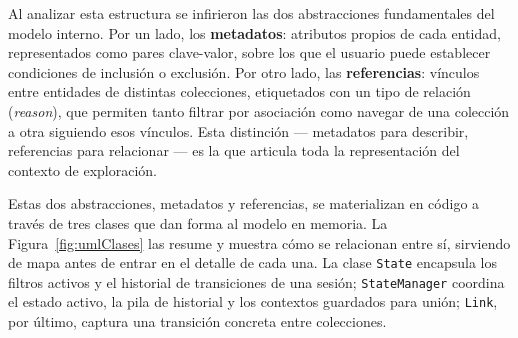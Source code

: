 Al analizar esta estructura se infirieron las dos abstracciones fundamentales del modelo
interno. Por un lado, los \textbf{metadatos}: atributos propios de cada entidad, representados
como pares clave-valor, sobre los que el usuario puede establecer condiciones de inclusión o
exclusión. Por otro lado, las \textbf{referencias}: vínculos entre entidades de distintas
colecciones, etiquetados con un tipo de relación (\textit{reason}), que permiten tanto filtrar
por asociación como navegar de una colección a otra siguiendo esos vínculos. Esta distinción
--- metadatos para describir, referencias para relacionar --- es la que articula toda la
representación del contexto de exploración.

Estas dos abstracciones, metadatos y referencias, se materializan en
código a través de tres clases que dan forma al modelo en memoria. La
Figura~\ref{fig:umlClases} las resume y muestra cómo se relacionan
entre sí, sirviendo de mapa antes de entrar en el detalle de cada una.
La clase \texttt{State} encapsula los filtros activos y el historial
de transiciones de una sesión; \texttt{StateManager} coordina el
estado activo, la pila de historial y los contextos guardados para
unión; \texttt{Link}, por último, captura una transición concreta
entre colecciones.

